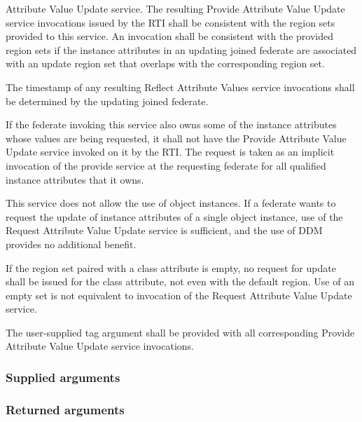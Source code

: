 \begin{compactstdpage}

    Attribute Value Update \rtiinitiated{} service. The resulting Provide Attribute Value Update \rtiinitiated{} service invocations issued by the RTI shall be consistent with the region sets provided to this service. An invocation shall be consistent with the provided region sets if the instance attributes in an updating joined federate are associated with an update region set that overlaps with the corresponding region set.

    The timestamp of any resulting Reflect Attribute Values \rtiinitiated{} service invocations shall be determined by the updating joined federate.

    If the federate invoking this service also owns some of the instance attributes whose values are being requested, it shall not have the Provide Attribute Value Update\rtiinitiated{} service invoked on it by the RTI. The request is taken as an implicit invocation of the provide service at the requesting federate for all qualified instance attributes that it owns.

    This service does not allow the use of object instances. If a federate wants to request the update of instance attributes of a single object instance, use of the Request Attribute Value Update service is sufficient, and the use of DDM provides no additional benefit.

    If the region set paired with a class attribute is empty, no request for update shall be issued for the class attribute, not even with the default region. Use of an empty set is not equivalent to invocation of the Request Attribute Value Update service.

    The user-supplied tag argument shall be provided with all corresponding Provide Attribute Value Update \rtiinitiated{} service invocations.

    \subsubsection{Supplied arguments}


    \subsubsection{Returned arguments}


\end{compactstdpage}
